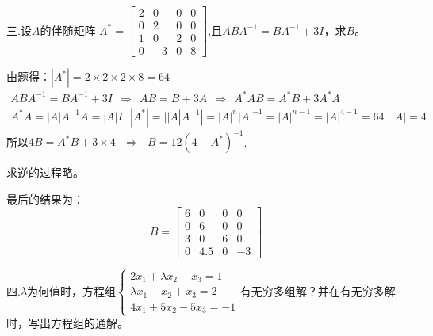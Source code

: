 \documentclass{article}
\begin{document}
三.设$A$的伴随矩阵
$
A^{*}=
\begin{bmatrix}
  2 & 0 & 0 & 0\\
  0 & 2 & 0 & 0\\
  1 & 0 & 2 & 0\\
  0 & -3 & 0 & 8
\end{bmatrix}
$,且$ABA^{-1}=BA^{-1}+3I$，求$B$。

\begin{jie}
由题得：$|A^*|=2\times2\times2\times8=64$
\begin{gather*}
ABA^{-1}=BA^{-1}+3I~~\Rightarrow~~AB=B+3A~~\Rightarrow~~A^*AB=A^*B+3A^*A\\
A^*A=|A|A^{-1}A=|A|I~~~|A^*|=||A|A^{-1}|=|A|^n|A|^{-1}=|A|^{n-1}=|A|^{4-1}=64~~~|A|=4
\end{gather*}
所以$4B=A^*B+3\times4~~~\Rightarrow~~~B=12(4-A^*)^{-1}$.

求逆的过程略。

最后的结果为：
\begin{equation*}
  B=\begin{bmatrix}
  6 & 0 & 0 & 0\\
  0 & 6 & 0 & 0\\
  3 & 0 & 6 & 0\\
  0 & 4.5 & 0 & -3
\end{bmatrix}
\end{equation*}
\end{jie}

四.$\lambda$为何值时，方程组$
\begin{cases}
 2x_{1}+\lambda x_{2}-x_{3}=1\\
 \lambda x_{1}-x_{2}+x_{3}=2\\
 4x_{1}+5 x_{2}-5x_{3}=-1
\end{cases}
$有无穷多组解？并在有无穷多解时，写出方程组的通解。
\end{document}
